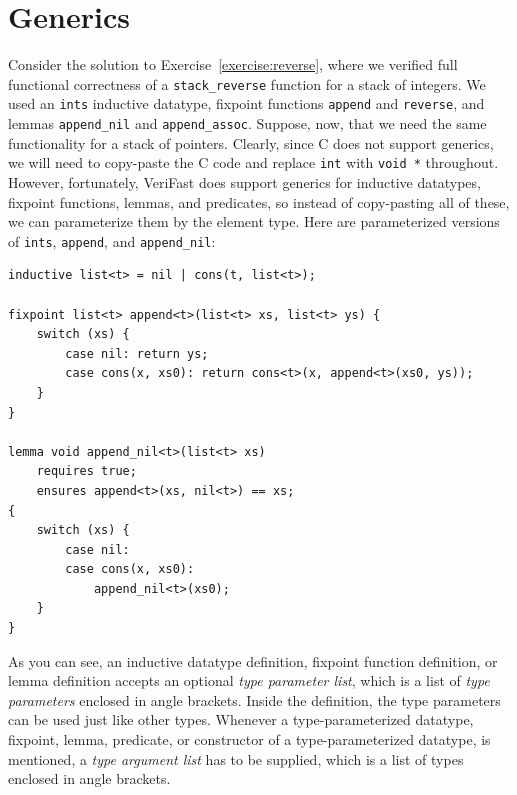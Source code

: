 \documentclass{article}
\begin{document}
\section{Generics}\label{section:generics}

Consider the solution to Exercise~\ref{exercise:reverse}, where
we verified full functional correctness of a
\lstinline!stack_reverse! function for a stack of integers. We
used an \lstinline!ints! inductive datatype, fixpoint functions
\lstinline!append! and \lstinline!reverse!, and lemmas
\lstinline!append_nil! and \lstinline!append_assoc!. Suppose,
now, that we need the same functionality for a stack of
pointers. Clearly, since C does not support generics, we will
need to copy-paste the C code and replace \lstinline!int! with
\lstinline!void *! throughout. However, fortunately, VeriFast
does support generics for inductive datatypes, fixpoint
functions, lemmas, and predicates, so instead of copy-pasting
all of these, we can parameterize them by the element type.
Here are parameterized versions of \lstinline!ints!,
\lstinline!append!, and \lstinline!append_nil!:
\begin{lstlisting}
inductive list<t> = nil | cons(t, list<t>);

fixpoint list<t> append<t>(list<t> xs, list<t> ys) {
    switch (xs) {
        case nil: return ys;
        case cons(x, xs0): return cons<t>(x, append<t>(xs0, ys));
    }
}

lemma void append_nil<t>(list<t> xs)
    requires true;
    ensures append<t>(xs, nil<t>) == xs;
{
    switch (xs) {
        case nil:
        case cons(x, xs0):
            append_nil<t>(xs0);
    }
}
\end{lstlisting}
As you can see, an inductive datatype definition, fixpoint
function definition, or lemma definition accepts an optional
\emph{type parameter list}, which is a list of \emph{type
parameters} enclosed in angle brackets. Inside the definition,
the type parameters can be used just like other types. Whenever
a type-parameterized datatype, fixpoint, lemma, predicate, or
constructor of a type-parameterized datatype, is mentioned, a
\emph{type argument list} has to be supplied, which is a list
of types enclosed in angle brackets.
\end{document}
